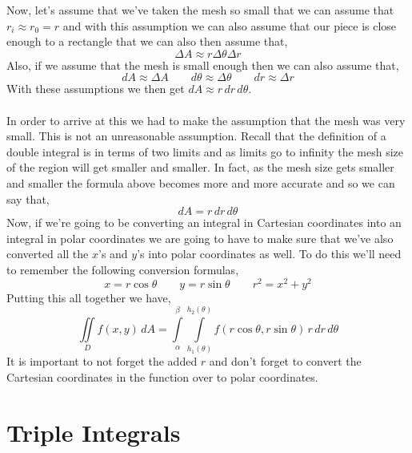 \documentclass[10pt,reqno]{book}
\theoremstyle{definition}
\begin{document}
	Now, let's assume that we've taken the mesh so small that we can assume that $ r_i \approx r_0 = r $ and with this assumption we can also assume that our piece is close enough to a rectangle that we can also then assume that,
	\[ \Delta A \approx r\Delta \theta \Delta r \]
	Also, if we assume that the mesh is small enough then we can also assume that,
	\[ dA \approx \Delta A \qquad d\theta \approx \Delta \theta \qquad dr \approx \Delta r \]
	With these assumptions we then get $ dA \approx r\,dr\,d\theta $.\\ \\
	In order to arrive at this we had to make the assumption that the mesh was very small. This is not an unreasonable assumption. Recall that the definition of a double integral is in terms of two limits and as limits go to infinity the mesh size of the region will get smaller and smaller. In fact, as the mesh size gets smaller and smaller the formula above becomes more and more accurate and so we can say that,
	\[ dA = r\,dr\,d\theta \]
	Now, if we're going to be converting an integral in Cartesian coordinates into an integral in polar coordinates we are going to have to make sure that we've also converted all the $ x $'s and $ y $'s into polar coordinates as well. To do this we'll need to remember the following conversion formulas,
	\[ x = r\cos\theta \qquad y = r\sin\theta \qquad r^2 = x^2 + y^2 \]
	Putting this all together we have,
	\[ \iint\limits_D f(x,y)\,dA = \int\limits_{\alpha}^{\beta} \int\limits_{h_1(\theta)}^{h_2(\theta)} f(r\cos\theta, r\sin\theta)\,r\,dr\,d\theta \]
	It is important to not forget the added $ r $ and don't forget to convert the Cartesian coordinates in the function over to polar coordinates.
	
	\section{Triple Integrals}
	
\end{document}
